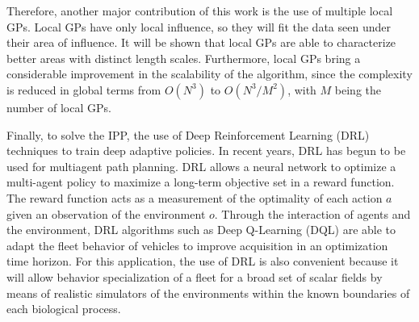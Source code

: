 \documentclass[journal]{IEEEtran}
\newcommand\changes[1]{\textcolor{black}{#1}}
\newcommand\vect[1]{\boldsymbol{#1}}
\begin{document}

Therefore, another major contribution of this work is the use of multiple local GPs. Local GPs have only local influence, so they will fit the data seen under their area of influence. It will be shown that local GPs are able to characterize better areas with distinct length scales. Furthermore, local GPs bring a considerable improvement in the scalability of the algorithm, since the complexity is reduced in global terms from $O(N^3)$ to $O(N^3 / M ^ 2)$, with $M$ being the number of local GPs. 


Finally, to solve the IPP, the use of Deep Reinforcement Learning (DRL) techniques to train deep adaptive policies. In recent years, DRL has begun to be used for multiagent \cite{yanes_multiagent_2021} path planning. DRL allows a neural network to optimize a multi-agent policy to maximize a long-term objective set in a reward function. The reward function acts as a measurement of the optimality of each action $a$ given an observation of the environment $o$. Through the interaction of agents and the environment, DRL algorithms such as Deep Q-Learning (DQL) \cite{mnih_human-level_2015} are able to adapt the fleet behavior of vehicles to improve acquisition in an optimization time horizon. For this application, the use of DRL is also convenient because it will allow behavior specialization of a fleet for a broad set of scalar fields by means of realistic simulators of the environments within the known boundaries of each biological process.


\end{document}
